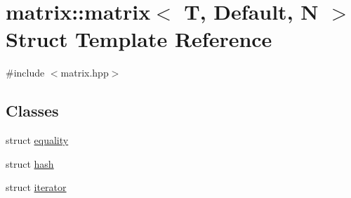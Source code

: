 \hypertarget{structmatrix_1_1matrix}{}\section{matrix\+:\+:matrix$<$ T, Default, N $>$ Struct Template Reference}
\label{structmatrix_1_1matrix}


{\ttfamily \#include $<$matrix.\+hpp$>$}

\subsection*{Classes}
\begin{DoxyCompactItemize}
\item 
struct \hyperlink{structmatrix_1_1matrix_1_1equality}{equality}
\item 
struct \hyperlink{structmatrix_1_1matrix_1_1hash}{hash}
\item 
struct \hyperlink{structmatrix_1_1matrix_1_1iterator}{iterator}
\end{DoxyCompactItemize}
